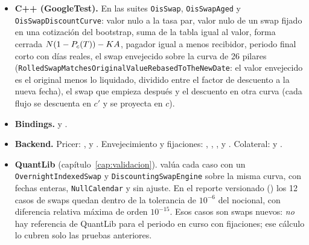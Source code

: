 \begin{itemize}
  \item \textbf{C++ (GoogleTest).} En  las suites
        \texttt{OisSwap}, \texttt{OisSwapAged} y \texttt{OisSwapDiscountCurve}: valor nulo a la tasa par, valor
        nulo de un swap fijado en una cotización del bootstrap, suma de la tabla igual al valor, forma cerrada
        $N(1-P_{c}(T))-KA$, pagador igual a menos recibidor, periodo final corto con días reales,
        el swap envejecido sobre la curva de 26 pilares 
        (\texttt{RolledSwapMatchesOriginalValueRebasedToTheNewDate}: el valor envejecido es el original
        menos lo liquidado, dividido entre el factor de descuento a la nueva fecha), el swap que empieza
        después y el descuento en otra curva (cada flujo se descuenta en $c'$ y se proyecta en $c$).
  \item \textbf{Bindings.}  y
        .
  \item \textbf{Backend.} Pricer: ,
         y
        . Envejecimiento y fijaciones:
        ,
        ,
        ,
         y
        . Colateral:
        y .
  \item \textbf{QuantLib} (capítulo~\ref{cap:validacion}). 
        valúa cada caso con un \texttt{OvernightIndexedSwap} y \texttt{DiscountingSwapEngine} sobre la misma
        curva, con fechas enteras, \texttt{NullCalendar} y sin ajuste. En el reporte versionado
        () los 12 casos de swaps quedan dentro de la tolerancia
        de $10^{-6}$ del nocional, con diferencia relativa máxima de orden $10^{-15}$. Esos casos son swaps
        nuevos: \emph{no} hay referencia de QuantLib para el periodo en curso con fijaciones; ese cálculo lo
        cubren solo las pruebas anteriores.
\end{itemize}

